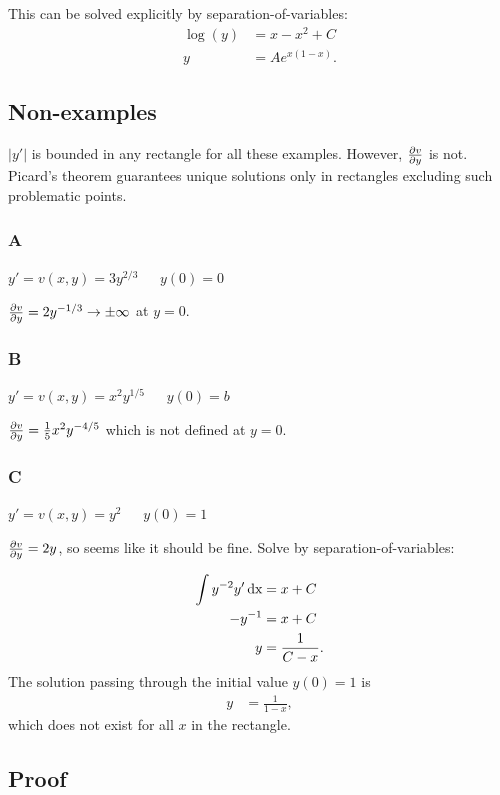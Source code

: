 This can be solved explicitly by separation-of-variables:
\begin{align*}
  \log(y) &= x- x^2 + C\\
  y       &= Ae^{x(1-x)}.
\end{align*}


\subsection{Non-examples}

$|y'|$ is bounded in any rectangle for all these examples. However,
$\frac{\partial v}{\partial y}$ is not. Picard's theorem guarantees unique solutions only in
rectangles excluding such problematic points.

\subsubsection{A}
$y' = v(x, y) = 3y^{2/3}  ~~~~~~~ y(0) = 0$

$\frac{\partial v}{\partial y} = 2y^{-1/3} \to \pm \infty$ at $y=0$.


\subsubsection{B}
$y' = v(x, y) = x^2y^{1/5} ~~~~~~~ y(0) = b$

$\frac{\partial v}{\partial y} = \frac{1}{5}x^2y^{-4/5}$ which is not defined at $y=0$.

\subsubsection{C}
$y' = v(x, y) = y^2       ~~~~~~~ y(0) = 1$

$\frac{\partial v}{\partial y} = 2y$, so seems like it should be fine. Solve by
separation-of-variables:

\begin{align*}
  \int y^{-2} y' \operatorname{\text{dx}} &= x + C\\
  -y^{-1}            &= x + C\\
  y                 &= \frac{1}{C - x}.
\end{align*}
The solution passing through the initial value $y(0) = 1$ is
\begin{align*}
  y                  &= \frac{1}{1 - x},
\end{align*}
which does not exist for all $x$ in the rectangle.


\newpage
\subsection{Proof}

